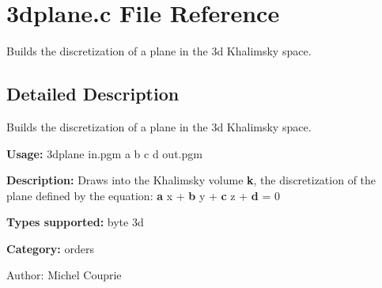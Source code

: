 \section{3dplane.c File Reference}
\label{3dplane_8c}
Builds the discretization of a plane in the 3d Khalimsky space. 



\subsection{Detailed Description}
Builds the discretization of a plane in the 3d Khalimsky space. 

{\bf Usage:} 3dplane in.pgm a b c d out.pgm

{\bf Description:} Draws into the Khalimsky volume {\bf k}, the discretization of the plane defined by the equation: {\bf a} x + {\bf b} y + {\bf c} z + {\bf d} = 0

{\bf Types supported:} byte 3d

{\bf Category:} orders

\begin{Desc}
\item[Author:]Michel Couprie \end{Desc}
